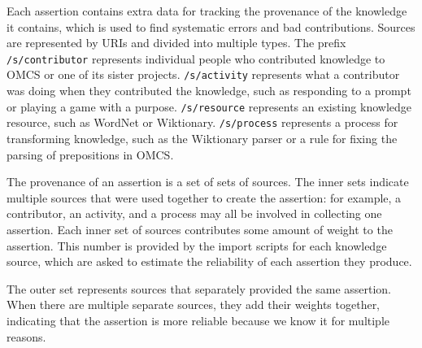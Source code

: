 \documentclass[letterpaper]{article}
\begin{document}
Each assertion contains extra data for tracking the provenance of the
knowledge it contains, which is used to find systematic errors and bad
contributions. Sources are represented by URIs and divided into multiple
types. The prefix \texttt{/s/contributor} represents individual people
who contributed knowledge to OMCS or one of its sister projects.
\texttt{/s/activity} represents what a contributor was doing when they
contributed the knowledge, such as responding to a prompt or playing a
game with a purpose. \texttt{/s/resource} represents an existing
knowledge resource, such as WordNet or Wiktionary. \texttt{/s/process}
represents a process for transforming knowledge, such as the Wiktionary
parser or a rule for fixing the parsing of prepositions in OMCS.

The provenance of an assertion is a set of sets of sources. The inner
sets indicate multiple sources that were used together to create the
assertion: for example, a contributor, an activity, and a process may
all be involved in collecting one assertion. Each inner set of sources
contributes some amount of weight to the assertion. This number is
provided by the import scripts for each knowledge source, which are
asked to estimate the reliability of each assertion they produce.

The outer set represents sources that separately provided the same
assertion. When there are multiple separate sources, they add their
weights together, indicating that the assertion is more reliable because
we know it for multiple reasons.




\end{document}
